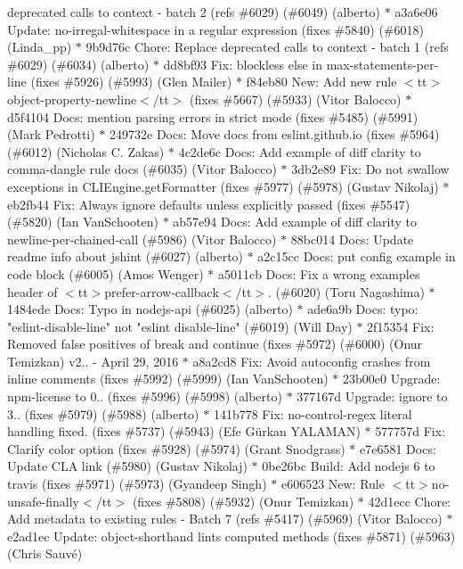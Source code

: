 \begin{DoxyItemize}
deprecated calls to context -\/ batch 2 (refs \#6029) (\#6049) (alberto) \texorpdfstring{$\ast$}{*} a3a6e06 Update\+: no-\/irregal-\/whitespace in a regular expression (fixes \#5840) (\#6018) (\+Linda\+\_\+pp) \texorpdfstring{$\ast$}{*} 9b9d76c Chore\+: Replace deprecated calls to context -\/ batch 1 (refs \#6029) (\#6034) (alberto) \texorpdfstring{$\ast$}{*} dd8bf93 Fix\+: blockless else in max-\/statements-\/per-\/line (fixes \#5926) (\#5993) (\+Glen Mailer) \texorpdfstring{$\ast$}{*} f84eb80 New\+: Add new rule $<$tt$>$object-\/property-\/newline$<$/tt$>$ (fixes \#5667) (\#5933) (\+Vitor Balocco) \texorpdfstring{$\ast$}{*} d5f4104 Docs\+: mention parsing errors in strict mode (fixes \#5485) (\#5991) (\+Mark Pedrotti) \texorpdfstring{$\ast$}{*} 249732e Docs\+: Move docs from eslint.\+github.\+io (fixes \#5964) (\#6012) (\+Nicholas C. Zakas) \texorpdfstring{$\ast$}{*} 4c2de6c Docs\+: Add example of diff clarity to comma-\/dangle rule docs (\#6035) (\+Vitor Balocco) \texorpdfstring{$\ast$}{*} 3db2e89 Fix\+: Do not swallow exceptions in CLIEngine.\+get\+Formatter (fixes \#5977) (\#5978) (\+Gustav Nikolaj) \texorpdfstring{$\ast$}{*} eb2fb44 Fix\+: Always ignore defaults unless explicitly passed (fixes \#5547) (\#5820) (\+Ian Van\+Schooten) \texorpdfstring{$\ast$}{*} ab57e94 Docs\+: Add example of diff clarity to newline-\/per-\/chained-\/call (\#5986) (\+Vitor Balocco) \texorpdfstring{$\ast$}{*} 88bc014 Docs\+: Update readme info about jshint (\#6027) (alberto) \texorpdfstring{$\ast$}{*} a2c15cc Docs\+: put config example in code block (\#6005) (\+Amos Wenger) \texorpdfstring{$\ast$}{*} a5011cb Docs\+: Fix a wrong examples\textquotesingle{} header of $<$tt$>$prefer-\/arrow-\/callback$<$/tt$>$. (\#6020) (\+Toru Nagashima) \texorpdfstring{$\ast$}{*} 1484ede Docs\+: Typo in nodejs-\/api (\#6025) (alberto) \texorpdfstring{$\ast$}{*} ade6a9b Docs\+: typo\+: "{}eslint-\/disable-\/line"{} not "{}eslint disable-\/line"{} (\#6019) (\+Will Day) \texorpdfstring{$\ast$}{*} 2f15354 Fix\+: Removed false positives of break and continue (fixes \#5972) (\#6000) (\+Onur Temizkan)  v2.. -\/ April 29, 2016  \texorpdfstring{$\ast$}{*} a8a2cd8 Fix\+: Avoid autoconfig crashes from inline comments (fixes \#5992) (\#5999) (\+Ian Van\+Schooten) \texorpdfstring{$\ast$}{*} 23b00e0 Upgrade\+: npm-\/license to 0.. (fixes \#5996) (\#5998) (alberto) \texorpdfstring{$\ast$}{*} 377167d Upgrade\+: ignore to 3.. (fixes \#5979) (\#5988) (alberto) \texorpdfstring{$\ast$}{*} 141b778 Fix\+: no-\/control-\/regex literal handling fixed. (fixes \#5737) (\#5943) (\+Efe Gürkan YALAMAN) \texorpdfstring{$\ast$}{*} 577757d Fix\+: Clarify color option (fixes \#5928) (\#5974) (\+Grant Snodgrass) \texorpdfstring{$\ast$}{*} e7e6581 Docs\+: Update CLA link (\#5980) (\+Gustav Nikolaj) \texorpdfstring{$\ast$}{*} 0be26bc Build\+: Add nodejs 6 to travis (fixes \#5971) (\#5973) (\+Gyandeep Singh) \texorpdfstring{$\ast$}{*} e606523 New\+: Rule $<$tt$>$no-\/unsafe-\/finally$<$/tt$>$ (fixes \#5808) (\#5932) (\+Onur Temizkan) \texorpdfstring{$\ast$}{*} 42d1ecc Chore\+: Add metadata to existing rules -\/ Batch 7 (refs \#5417) (\#5969) (\+Vitor Balocco) \texorpdfstring{$\ast$}{*} e2ad1ec Update\+: object-\/shorthand lints computed methods (fixes \#5871) (\#5963) (\+Chris Sauvé) 
\end{DoxyItemize}
